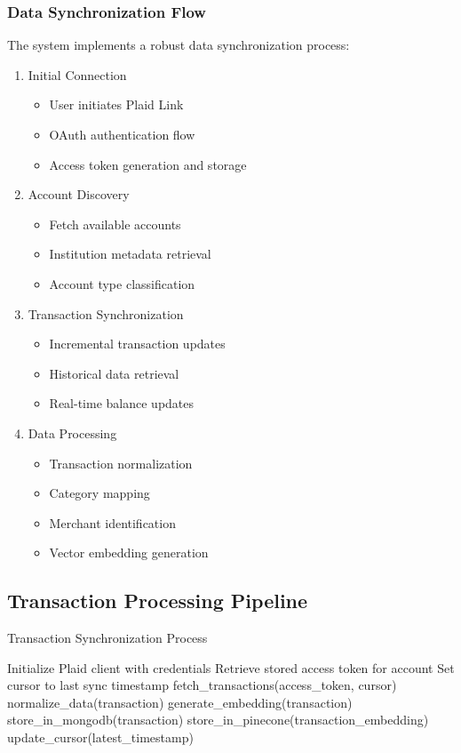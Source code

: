\documentclass[conference]{IEEEtran}
\begin{document}
\subsubsection{Data Synchronization Flow}
The system implements a robust data synchronization process:

\begin{enumerate}
\item Initial Connection
\begin{itemize}
\item User initiates Plaid Link
\item OAuth authentication flow
\item Access token generation and storage
\end{itemize}

\item Account Discovery
\begin{itemize}
\item Fetch available accounts
\item Institution metadata retrieval
\item Account type classification
\end{itemize}

\item Transaction Synchronization
\begin{itemize}
\item Incremental transaction updates
\item Historical data retrieval
\item Real-time balance updates
\end{itemize}

\item Data Processing
\begin{itemize}
\item Transaction normalization
\item Category mapping
\item Merchant identification
\item Vector embedding generation
\end{itemize}
\end{enumerate}

\subsection{Transaction Processing Pipeline}
\begin{algorithm}[H]
\caption{Transaction Synchronization Process}
\begin{algorithmic}[1]
\STATE Initialize Plaid client with credentials
\STATE Retrieve stored access token for account
\STATE Set cursor to last sync timestamp
\STATE fetch\_transactions(access\_token, cursor)
\STATE normalize\_data(transaction)
\STATE generate\_embedding(transaction)
\STATE store\_in\_mongodb(transaction)
\STATE store\_in\_pinecone(transaction\_embedding)
\ENDFOR
\STATE update\_cursor(latest\_timestamp)
\ENDWHILE
\end{algorithmic}
\end{algorithm}
\end{document}
